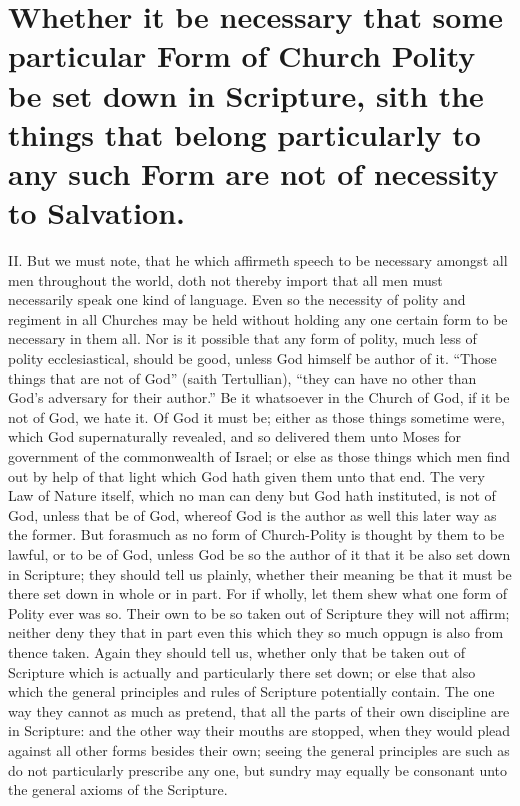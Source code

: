 \section*{Whether it be necessary that some particular Form of Church Polity be set down in Scripture, sith the things that belong particularly to any such Form are not of necessity to Salvation.}

II. But we must note, that he which affirmeth speech to be necessary amongst all men throughout the world, doth not thereby import that all men must necessarily speak one kind of language. Even so the necessity of polity and regiment in all Churches may be held without holding any one certain form to be necessary in them all. Nor is it possible that any form of polity, much less of polity ecclesiastical, should be good, unless God himself be author of it. “Those things that are not of God” (saith Tertullian), “they can have no other than God’s adversary for their author.” Be it whatsoever in the Church of God, if it be not of God, we hate it. Of God it must be; either as those things sometime were, which God supernaturally revealed, and so delivered them unto Moses for government of the commonwealth of Israel; or else as those things which men find  out by help of that light which God hath given them unto that end. The very Law of Nature itself, which no man can deny but God hath instituted, is not of God, unless that be of God, whereof God is the author as well this later way as the former. But forasmuch as no form of Church-Polity is thought by them to be lawful, or to be of God, unless God be so the author of it that it be also set down in Scripture; they should tell us plainly, whether their meaning be that it must be there set down in whole or in part. For if wholly, let them shew what one form of Polity ever was so. Their own to be so taken out of Scripture they will not affirm; neither deny they that in part even this which they so much oppugn is also from thence taken. Again they should tell us, whether only that be taken out of Scripture which is actually and particularly there set down; or else that also which the general principles and rules of Scripture potentially contain. The one way they cannot as much as pretend, that all the parts of their own discipline are in Scripture: and the other way their mouths are stopped, when they would plead against all other forms besides their own; seeing the general principles are such as do not particularly prescribe any one, but sundry may equally be consonant unto the general axioms of the Scripture.

